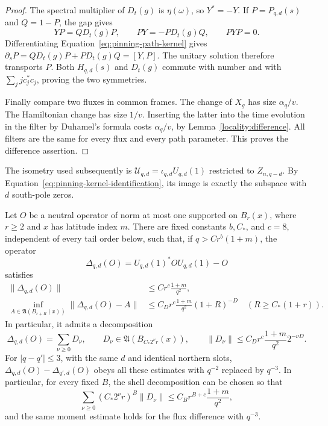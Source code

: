 \begin{proof}
The spectral multiplier of $D_t(g)$ is $\eta(\omega)$, so $Y^*=-Y$.
If $P=P_{q,d}(s)$ and $Q=1-P$, the gap gives
\[
 YP=QD_t(g)P,\qquad PY=-PD_t(g)Q,\qquad PYP=0.
\]
Differentiating Equation~\eqref{eq:pinning-path-kernel} gives
$\partial_sP=QD_t(g)P+PD_t(g)Q=[Y,P]$.  The unitary solution therefore
transports $P$.  Both $H_{q,d}(s)$ and $D_t(g)$ commute with number and
with $\sum_jj c_j^*c_j$, proving the two symmetries.

Finally compare two fluxes in common frames.  The change of $X_g$ has
size $\alpha_q/v$.  The Hamiltonian change has size $1/v$.  Inserting
the latter into the time evolution in the filter by Duhamel's formula
costs $\alpha_q/v$, by Lemma~\ref{locality:difference}.  All filters are
the same for every flux and every path parameter.  This proves the
difference assertion.
\end{proof}

The isometry used subsequently is
$\mathcal U_{q,d}=\iota_{q,d}U_{q,d}(1)$ restricted to $Z_{n,q-d}$.
By Equation~\eqref{eq:pinning-kernel-identification}, its image is exactly
the subspace with $d$ south-pole zeros.

\begin{corollary}
\label{pinning:northern-observable}
Let $O$ be a neutral operator of norm at most one supported on $B_r(x)$,
where $r\ge2$ and $x$ has latitude index $m$.  There are fixed constants
$b,C_*$, and $c=8$, independent of every tail order below, such that,
if $q>Cr^b(1+m)$, the operator
\[
 \Delta_{q,d}(O)=U_{q,d}(1)^*OU_{q,d}(1)-O
\]
satisfies
\begin{align}
 \|\Delta_{q,d}(O)\|&\le C r^c\frac{1+m}{q^2},\label{eq:pinning-northern-norm}\\
 \inf_{A\in\mathfrak A(B_{r+R}(x))}\|\Delta_{q,d}(O)-A\|
 &\le C_D r^c\frac{1+m}{q^2}(1+R)^{-D}
 \quad(R\ge C_*(1+r)).\label{eq:pinning-northern-tail}
\end{align}
In particular, it admits a decomposition
\begin{equation}
 \Delta_{q,d}(O)=\sum_{\nu\ge0}D_\nu,\qquad
 D_\nu\in\mathfrak A(B_{C_*2^\nu r}(x)),\qquad
 \|D_\nu\|\le C_D r^c\frac{1+m}{q^2}2^{-\nu D}.
 \label{eq:pinning-northern-shells}
\end{equation}
For $|q-q'|\le3$, with the same $d$ and identical northern slots,
$\Delta_{q,d}(O)-\Delta_{q',d}(O)$ obeys all these estimates with
$q^{-2}$ replaced by $q^{-3}$.  In particular, for every fixed $B$,
the shell decomposition can be chosen so that
\begin{equation}
 \sum_{\nu\ge0}(C_*2^\nu r)^B\|D_\nu\|
 \le C_B r^{B+c}\frac{1+m}{q^2},
 \label{eq:pinning-northern-moment}
\end{equation}
and the same moment estimate holds for the flux difference with $q^{-3}$.
\end{corollary}

